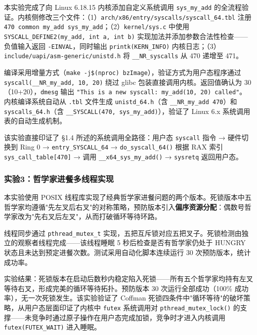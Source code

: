 \documentclass[a4paper]{article}
\begin{document}
本实验完成了向 Linux 6.18.15 内核添加自定义系统调用 \texttt{sys\_my\_add} 的全流程验证。内核侧修改三个文件：（1）\texttt{arch/x86/entry/syscalls/syscall\_64.tbl} 注册 \texttt{470 common my\_add sys\_my\_add}；（2）\texttt{kernel/sys.c} 中使用 \texttt{SYSCALL\_DEFINE2(my\_add, int a, int b)} 实现加法并添加参数合法性检查——负值输入返回 \texttt{-EINVAL}，同时输出 \texttt{printk(KERN\_INFO)} 内核日志；（3）\texttt{include/uapi/asm-generic/unistd.h} 将 \texttt{\_\_NR\_syscalls} 从 470 递增至 471。

编译采用增量方式（\texttt{make -j\$(nproc) bzImage}），验证方式为用户态程序通过 \texttt{syscall(\_\_NR\_my\_add, 10, 20)} 绕过 glibc 包装直接调用内核。返回值确认为 30（10+20），\texttt{dmesg} 输出 \texttt{"This is a new syscall: my\_add(10, 20) called"}。内核编译系统自动从 \texttt{.tbl} 文件生成 \texttt{unistd\_64.h}（含 \texttt{\_\_NR\_my\_add 470}）和 \texttt{syscalls\_64.h}（含 \texttt{\_\_SYSCALL(470, sys\_my\_add)}），验证了 Linux 6.x 系统调用表的自动生成机制。

该实验直接印证了 §1.4 所述的系统调用全路径：用户态 \texttt{syscall} 指令 → 硬件切换到 Ring 0 → \texttt{entry\_SYSCALL\_64} → \texttt{do\_syscall\_64()} 根据 RAX 索引 \texttt{sys\_call\_table[470]} → 调用 \texttt{\_\_x64\_sys\_my\_add()} → \texttt{sysretq} 返回用户态。

\subsubsection{实验3：哲学家进餐多线程实现}

本实验使用 POSIX 线程库实现了经典哲学家进餐问题的两个版本。死锁版本中五哲学家均遵循"先左叉后右叉"的对称策略，预防版本引入\textbf{偏序资源分配}：偶数号哲学家改为"先右叉后左叉"，从而打破循环等待环路。

线程同步通过 \texttt{pthread\_mutex\_t} 实现，五把互斥锁对应五把叉子。死锁检测由独立的观察者线程完成——该线程睡眠 5 秒后检查是否有哲学家仍处于 HUNGRY 状态且未达到预定进餐次数。测试采用自动化脚本连续运行 30 次预防版本，统计成功率。

实验结果：死锁版本在启动后数秒内稳定陷入死锁——所有五个哲学家均持有左叉等待右叉，形成完美的循环等待拓扑。预防版本 30 次运行全部成功（100\% 成功率），无一次死锁发生。该实验验证了 Coffman 死锁四条件中"循环等待"的破坏策略，从用户态层面印证了内核中 \texttt{futex} 系统调用对 \texttt{pthread\_mutex\_lock()} 的支撑——未竞争时通过原子操作在用户态完成加锁，竞争时才进入内核调用 \texttt{futex(FUTEX\_WAIT)} 进入睡眠。

\end{document}

